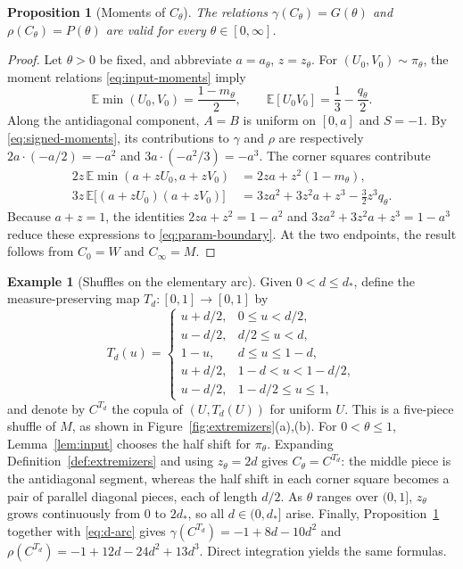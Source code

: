\documentclass{article}
\newtheorem{proposition}[theorem]{Proposition}
\theoremstyle{definition}
\newtheorem{example}[theorem]{Example}
\theoremstyle{remark}
\newcommand{\1}{\mathds{1}}
\newcommand{\E}{\mathbb{E}}
\newcommand{\I}{[0,1]}
\begin{document}
\begin{proposition}[Moments of $C_\theta$]\label{prop:moments}
	The relations $\gamma(C_\theta)=G(\theta)$ and $\rho(C_\theta)=P(\theta)$ are valid for every $\theta\in[0,\infty]$.
\end{proposition}

\begin{proof}
	Let $\theta>0$ be fixed, and abbreviate $a=a_\theta$, $z=z_\theta$.
	For $(U_0,V_0)\sim\pi_\theta$, the moment relations \eqref{eq:input-moments} imply
	\[
		\E\min(U_0,V_0)=\frac{1-m_\theta}{2},\qquad
		\E[U_0V_0]=\frac13-\frac{q_\theta}{2}.
	\]
	Along the antidiagonal component, $A=B$ is uniform on $[0,a]$ and $S=-1$. By \eqref{eq:signed-moments}, its contributions to $\gamma$ and $\rho$ are respectively $2a\cdot(-a/2)=-a^2$ and $3a\cdot(-a^2/3)=-a^3$. The corner squares contribute
	\[
	\begin{aligned}
		2z\,\E\min(a+zU_0,a+zV_0)&=2za+z^2(1-m_\theta),\\
		3z\,\E\bigl[(a+zU_0)(a+zV_0)\bigr]&=3za^2+3z^2a+z^3-\tfrac32z^3q_\theta.
	\end{aligned}
	\]
	Because $a+z=1$, the identities $2za+z^2=1-a^2$ and $3za^2+3z^2a+z^3=1-a^3$ reduce these expressions to \eqref{eq:param-boundary}. At the two endpoints, the result follows from $C_0=W$ and $C_\infty=M$.
\end{proof}

\begin{example}[Shuffles on the elementary arc]\label{ex:map}
	Given $0<d\le d_*$, define the measure-preserving map $T_d\colon\I\to\I$ by
	\[
		T_d(u)=\begin{cases}
			u+d/2,&0\le u<d/2,\\
			u-d/2,&d/2\le u<d,\\
			1-u,&d\le u\le1-d,\\
			u+d/2,&1-d<u<1-d/2,\\
			u-d/2,&1-d/2\le u\le1,
		\end{cases}
	\]
	and denote by $C^{T_d}$ the copula of $(U,T_d(U))$ for uniform $U$. This is a five-piece shuffle of $M$, as shown in Figure~\ref{fig:extremizers}(a),(b).
	For $0<\theta\le1$, Lemma~\ref{lem:input} chooses the half shift for $\pi_\theta$. Expanding Definition~\ref{def:extremizers} and using $z_\theta=2d$ gives $C_\theta=C^{T_d}$: the middle piece is the antidiagonal segment, whereas the half shift in each corner square becomes a pair of parallel diagonal pieces, each of length $d/2$.
	As $\theta$ ranges over $(0,1]$, $z_\theta$ grows continuously from $0$ to $2d_*$, so all $d\in(0,d_*]$ arise.
	Finally, Proposition~\ref{prop:moments} together with \eqref{eq:d-arc} gives $\gamma(C^{T_d})=-1+8d-10d^2$ and $\rho(C^{T_d})=-1+12d-24d^2+13d^3$. Direct integration yields the same formulas.
\end{example}
\end{document}
